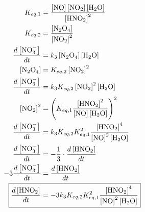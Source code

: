 \documentclass[12pt]{article}
\begin{document}
\begin{enumerate}
    \begin{align*}
        K_{eq,1} &= \frac{\left[\text{NO}\right]\left[\text{NO}_2\right]\left[\text{H$_2$O}\right]}{\left[\text{HNO}_2\right]^2} \\
        K_{eq,2} &= \frac{\left[\text{N$_2$O}_4\right]}{\left[\text{NO}_2\right]^2} \\
        \frac{d\left[\text{NO}_3^-\right]}{dt} &= k_3 \left[\text{N$_2$O}_4\right] \left[\text{H$_2$O}\right] \\
        \left[\text{N$_2$O}_4\right] &= K_{eq,2} \left[\text{NO}_2\right]^2 \\
        \frac{d\left[\text{NO}_3^-\right]}{dt} &= k_3 K_{eq,2} \left[\text{NO}_2\right]^2 \left[\text{H$_2$O}\right] \\
        \left[\text{NO}_2\right]^2 &= \left(K_{eq,1} \frac{\left[\text{HNO}_2\right]^2}{\left[\text{NO}\right]\left[\text{H$_2$O}\right]}\right)^2 \\
        \frac{d\left[\text{NO}_3^-\right]}{dt} &= k_3 K_{eq,2} K_{eq,1}^2 \frac{\left[\text{HNO}_2\right]^4}{\left[\text{NO}\right]^2\left[\text{H$_2$O}\right]} \\
        \frac{d\left[\text{NO}_3^-\right]}{dt} &= -\frac{1}{3} \cdot \frac{d\left[\text{HNO}_2\right]}{dt} \\
        -3 \frac{d\left[\text{NO}_3^-\right]}{dt} &= \frac{d\left[\text{HNO}_2\right]}{dt} \\
        \Aboxed{\frac{d\left[\text{HNO}_2\right]}{dt} &= -3 k_3 K_{eq,2} K_{eq,1}^2 \frac{\left[\text{HNO}_2\right]^4}{\left[\text{NO}\right]^2\left[\text{H$_2$O}\right]}}
    \end{align*}
    
   
\end{enumerate}
\end{document}
